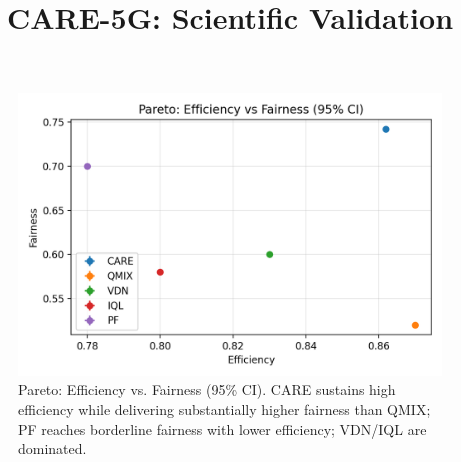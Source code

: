﻿\documentclass[conference]{IEEEtran}
\begin{document}
\title{CARE-5G: Scientific Validation}
\maketitle




\begin{figure}[t]
  \centering
  \includegraphics[width=\linewidth]{pareto.png}
  \caption{Pareto: Efficiency vs. Fairness (95\% CI). CARE sustains high efficiency while delivering substantially higher fairness than QMIX; PF reaches borderline fairness with lower efficiency; VDN/IQL are dominated.}
  \label{fig:pareto}
\end{figure}
\end{document}

